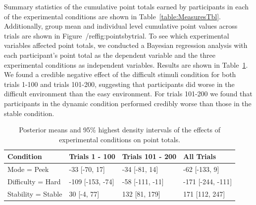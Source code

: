 \documentclass[a4paper,doc,natbib,floatsintext]{apa6}\usepackage[]{graphicx}\usepackage[]{color}
\begin{document}
Summary statistics of the cumulative point totals earned by participants in each of the experimental conditions are shown in Table~\ref{table:MeasuresTbl}. Additionally, group mean and individual level cumulative point values across trials are shown in Figure~/ref{fig:pointsbytrial}. To see which experimental variables affected point totals, we conducted a Bayesian regression analysis with each participant's point total as the dependent variable and the three experimental conditions as independent variables. Results are shown in Table~\ref{table:totals.model}. We found a credible negative effect of the difficult stimuli condition for both trials 1-100 and trials 101-200, suggesting that participants did worse in the difficult environment than the easy environment. For trials 101-200 we found that participants in the dynamic condition performed credibly worse than those in the stable condition.

\begin{table}[ht]
\centering
\begin{tabular}{llll}
  \hline
Condition & Trials 1 - 100 & Trials 101 - 200 & All Trials \\ 
  \hline
Mode = Peek & -33 [-70, 17] & -34 [-81, 14] & -62 [-133, 9] \\ 
  Difficulty = Hard & -109 [-153, -74] & -58 [-111, -11] & -171 [-244, -111] \\ 
  Stability = Stable & 30 [-4, 77] & 132 [81, 179] & 171 [112, 247] \\ 
   \hline
\end{tabular}
\caption{Posterior means and 95\% highest density intervals of the effects of experimental conditions on point totals.} 
\label{table:totals.model}
\end{table}
\end{document}
